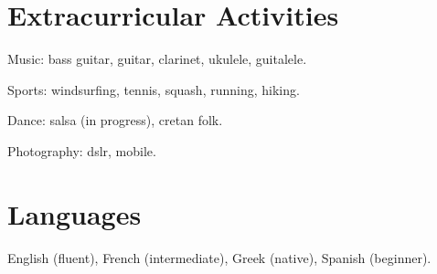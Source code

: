 \documentclass[letterpaper]{article}
\renewenvironment{itemize}{
  \begin{list}{}{
    \setlength{\leftmargin}{1.5em}
  }
}{
  \end{list}
}
\begin{document}
\section*{Extracurricular Activities}
\begin{itemize}
    \item Music: bass guitar, guitar, clarinet, ukulele, guitalele.
    \item Sports: windsurfing, tennis, squash, running, hiking.
    \item Dance: salsa (in progress), cretan folk.
    \item Photography: dslr, mobile.
\end{itemize}

\section*{Languages}
\begin{itemize}
    \item English (fluent), French (intermediate), Greek (native), Spanish (beginner).
\end{itemize}
\fi
\end{document}
